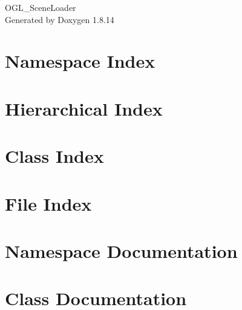 \documentclass[twoside]{book}
\newcommand{\+}{\discretionary{\mbox{\scriptsize$\hookleftarrow$}}{}{}}
\newcommand{\clearemptydoublepage}{%
  \newpage{\pagestyle{empty}\cleardoublepage}%
}
\begin{document}
\hypersetup{pageanchor=false,
             bookmarksnumbered=true,
             pdfencoding=unicode
            }
\begin{titlepage}
\vspace*{7cm}
\begin{center}%
{\Large O\+G\+L\+\_\+\+Scene\+Loader }\\
\vspace*{1cm}
{\large Generated by Doxygen 1.8.14}\\
\end{center}
\end{titlepage}
\clearemptydoublepage
{}
\tableofcontents
\clearemptydoublepage
{}
\hypersetup{pageanchor=true}

\chapter{Namespace Index}

\chapter{Hierarchical Index}

\chapter{Class Index}

\chapter{File Index}

\chapter{Namespace Documentation}


\chapter{Class Documentation}






















\end{document}

